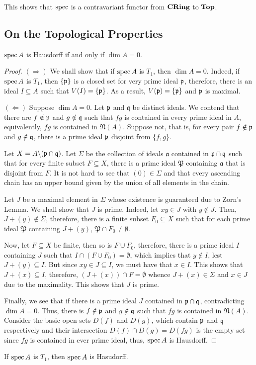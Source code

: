 This shows that $\operatorname{spec}$ is a contravariant functor from $\mathbf{CRing}$ to $\mathbf{Top}$. 

\subsection{On the Topological Properties}
\begin{proposition}
    $\operatorname{spec} A$ is Hausdorff if and only if $\dim A = 0$.
\end{proposition}
\begin{proof} 
$(\Longrightarrow)$ We shall show that if $\operatorname{spec} A$ is $T_1$, then $\dim A = 0$. Indeed, if $\operatorname{spec} A$ is $T_1$, then $\{\mathfrak p\}$ is a closed set for very prime ideal $\mathfrak p$, therefore, there is an ideal $I\subseteq A$ such that $V(I) = \{\mathfrak p\}$. As a result, $V(\mathfrak p) = \{\mathfrak p\}$ and $\mathfrak p$ is maximal.

$(\Longleftarrow)$ Suppose $\dim A = 0$. Let $\mathfrak p$ and $\mathfrak q$ be distinct ideals. We contend that there are $f\notin\mathfrak p$ and $g\notin\mathfrak q$ such that $fg$ is contained in every prime ideal in $A$, equivalently, $fg$ is contained in $\mathfrak N(A)$. Suppose not, that is, for every pair $f\notin\mathfrak p$ and $g\notin\mathfrak q$, there is a prime ideal $\mathfrak p$ disjoint from $\{f,g\}$.

Let $X = A\backslash(\mathfrak p\cap\mathfrak q)$. Let $\Sigma$ be the collection of ideals $\mathfrak a$ contained in $\mathfrak p\cap\mathfrak q$ such that for every finite subset $F\subseteq X$, there is a prime ideal $\mathfrak P$ containing $\mathfrak a$ that is disjoint from $F$. It is not hard to see that $(0)\in\Sigma$ and that every ascending chain has an upper bound given by the union of all elements in the chain.

Let $J$ be a maximal element in $\Sigma$ whose existence is guaranteed due to Zorn's Lemma. We shall show that $J$ is prime. Indeed, let $xy\in J$ with $y\notin J$. Then, $J + (y)\notin\Sigma$, therefore, there is a finite subset $F_0\subseteq X$ such that for each prime ideal $\mathfrak P$ containing $J + (y)$, $\mathfrak P\cap F_0\ne\emptyset$.

Now, let $F\subseteq X$ be finite, then so is $F\cup F_0$, therefore, there is a prime ideal $I$ containing $J$ such that $I\cap(F\cup F_0) = \emptyset$, which implies that $y\notin I$, lest $J + (y)\subseteq I$. But since $xy\in J\subseteq I$, we must have that $x\in I$. This shows that $J + (x)\subseteq I$, therefore, $(J + (x))\cap F = \emptyset$ whence $J + (x)\in\Sigma$ and $x\in J$ due to the maximality. This shows that $J$ is prime.

Finally, we see that if there is a prime ideal $J$ contained in $\mathfrak p\cap\mathfrak q$, contradicting $\dim A = 0$. Thus, there is $f\notin\mathfrak p$ and $g\notin\mathfrak q$ such that $fg$ is contained in $\mathfrak N(A)$. Consider the basic open sets $D(f)$ and $D(g)$, which contain $\mathfrak p$ and $\mathfrak q$ respectively and their intersection $D(f)\cap D(g) = D(fg)$ is the empty set since $fg$ is contained in ever prime ideal, thus, $\operatorname{spec} A$ is Hausdorff.
\end{proof}

\begin{corollary}
    If $\operatorname{spec} A$ is $T_1$, then $\operatorname{spec} A$ is Hasudorff.
\end{corollary}

